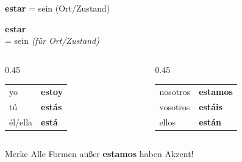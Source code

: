 \documentclass[aspectratio=169, 11pt]{beamer}
\newcommand{\de}[1]{{\small\textcolor{dunkelgrau}{\textit{#1}}}}
\newcommand{\estar}[1]{\textbf{\textcolor{blau}{#1}}}
\begin{document}
\begin{frame}{\estar{estar} = sein (Ort/Zustand)}

\begin{center}
{\Huge \estar{estar}}\\[0.3cm]
{\Large = sein \de{(für Ort/Zustand)}}
\end{center}

\vspace{0.5cm}

\begin{columns}[c]
\begin{column}{0.45\textwidth}
\begin{center}
\begin{tabular}{@{}ll@{}}
yo & \estar{estoy} \\[0.3em]
tú & \estar{estás} \\[0.3em]
él/ella & \estar{está} \\
\end{tabular}
\end{center}
\end{column}

\begin{column}{0.45\textwidth}
\begin{center}
\begin{tabular}{@{}ll@{}}
nosotros & \estar{estamos} \\[0.3em]
vosotros & \estar{estáis} \\[0.3em]
ellos & \estar{están} \\
\end{tabular}
\end{center}
\end{column}
\end{columns}

\vspace{0.5cm}

\begin{alertblock}{Merke}
Alle Formen außer \estar{estamos} haben Akzent!
\end{alertblock}

\end{frame}
\end{document}
